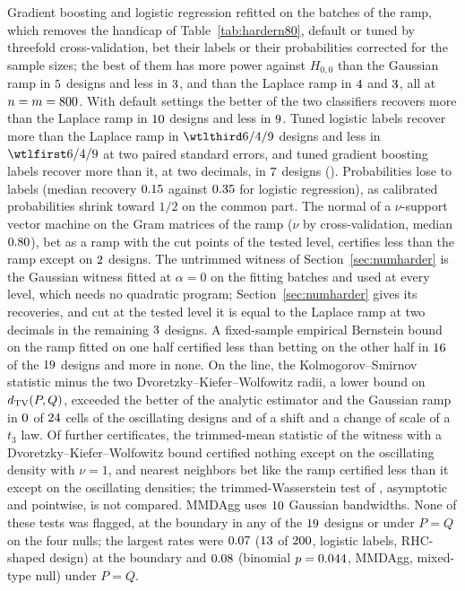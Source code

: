 Gradient boosting and logistic regression refitted on the batches of the ramp, which
removes the handicap of Table~\ref{tab:hardern80}, default or tuned by threefold cross-validation, bet their labels or
their probabilities corrected for the sample sizes; the best of them has more power against $H_{0,0}$ than the Gaussian
ramp in $5$ designs and less in $3$, and than the Laplace ramp in
$4$ and $3$, all at $n=m=800$. With default settings the better of the
two classifiers recovers more than the Laplace ramp in $10$ designs and less in
$9$. Tuned logistic labels recover more than the Laplace ramp in
$\wtllosses{\mnWtlRecLogitTuned}$ designs and less in $\wtlwins{\mnWtlRecLogitTuned}$ at two paired standard errors,
and tuned gradient boosting labels recover more than it, at two decimals, in $7$ designs
(\dvGbmTunedAboveLapDesigns).
Probabilities lose to labels (median recovery $0.15$ against $0.35$ for
logistic regression), as calibrated probabilities shrink toward $1/2$ on the common part. The normal of a $\nu$-support
vector machine on the Gram matrices of the ramp ($\nu$ by cross-validation, median $0.80$), bet as a ramp with
the cut points of the tested level, certifies less than the ramp except on $2$ designs. The untrimmed
witness of Section~\ref{sec:numharder} is the Gaussian witness fitted at $\alpha=0$ on the fitting batches and used at
every level, which needs no quadratic program; Section~\ref{sec:numharder} gives its recoveries, and cut at the tested
level it is equal to the Laplace ramp at two decimals in the remaining $3$ designs. A
fixed-sample empirical Bernstein bound on the ramp fitted on one half certified less than betting on the other half in
$16$ of the $19$ designs and more in none. On the line, the Kolmogorov--Smirnov statistic
minus the two Dvoretzky--Kiefer--Wolfowitz radii, a lower bound on $d_{\mathrm{TV}}(P,Q)$, exceeded the better of the analytic
estimator and the Gaussian ramp in $0$ of $24$ cells of the oscillating designs and of a shift and
a change of scale of a $t_3$ law. Of further certificates, the trimmed-mean statistic of the witness
with a Dvoretzky--Kiefer--Wolfowitz bound certified nothing except on the oscillating density with $\nu=1$, and nearest
neighbors bet like the ramp certified less than it except on the oscillating densities; the trimmed-Wasserstein test of \citet{alvarez2012similarity}, asymptotic and pointwise, is not
compared. MMDAgg \citep{schrab2023aggregated} uses $10$ Gaussian bandwidths. None of these tests was flagged, at the boundary in any of the
$19$ designs or under $P=Q$ on the four nulls; the largest rates were $0.07$ ($13$ of
$200$, logistic labels, RHC-shaped design) at the boundary and $0.08$ (binomial $p=0.044$, MMDAgg,
mixed-type null) under $P=Q$.


